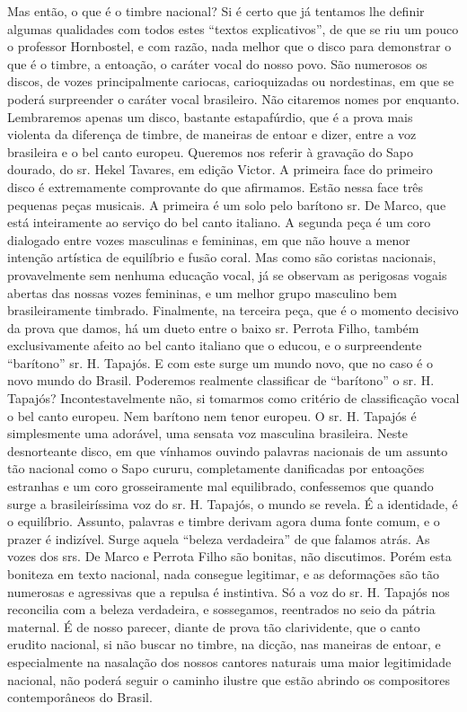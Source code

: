 Mas então, o que é o timbre nacional? Si é certo que já tentamos lhe
definir algumas qualidades com todos estes ``textos explicativos'', de
que se riu um pouco o professor Hornbostel, e com razão, nada melhor que
o disco para demonstrar o que é o timbre, a entoação, o caráter vocal do
nosso povo. São numerosos os discos, de vozes principalmente cariocas,
carioquizadas ou nordestinas, em que se poderá surpreender o caráter
vocal brasileiro. Não citaremos nomes por enquanto. Lembraremos apenas
um disco, bastante estapafúrdio, que é a prova mais violenta da
diferença de timbre, de maneiras de entoar e dizer, entre a voz
brasileira e o bel canto europeu. Queremos nos referir à gravação do
Sapo dourado, do sr. Hekel Tavares, em edição Victor. A primeira face do
primeiro disco é extremamente comprovante do que afirmamos. Estão nessa
face três pequenas peças musicais. A primeira é um solo pelo barítono
sr. De Marco, que está inteiramente ao serviço do bel canto italiano. A
segunda peça é um coro dialogado entre vozes masculinas e femininas, em
que não houve a menor intenção artística de equilíbrio e fusão coral.
Mas como são coristas nacionais, provavelmente sem nenhuma educação
vocal, já se observam as perigosas vogais abertas das nossas vozes
femininas, e um melhor grupo masculino bem brasileiramente timbrado.
Finalmente, na terceira peça, que é o momento decisivo da prova que
damos, há um dueto entre o baixo sr. Perrota Filho, também
exclusivamente afeito ao bel canto italiano que o educou, e o
surpreendente ``barítono'' sr. H. Tapajós. E com este surge um mundo
novo, que no caso é o novo mundo do Brasil. Poderemos realmente
classificar de ``barítono'' o sr. H. Tapajós? Incontestavelmente não, si
tomarmos como critério de classificação vocal o bel canto europeu. Nem
barítono nem tenor europeu. O sr. H. Tapajós é simplesmente uma
adorável, uma sensata voz masculina brasileira. Neste desnorteante
disco, em que vínhamos ouvindo palavras nacionais de um assunto tão
nacional como o Sapo cururu, completamente danificadas por entoações
estranhas e um coro grosseiramente mal equilibrado, confessemos que
quando surge a brasileiríssima voz do sr. H. Tapajós, o mundo se revela.
É a identidade, é o equilíbrio. Assunto, palavras e timbre derivam agora
duma fonte comum, e o prazer é indizível. Surge aquela ``beleza
verdadeira'' de que falamos atrás. As vozes dos srs. De Marco e Perrota
Filho são bonitas, não discutimos. Porém esta boniteza em texto
nacional, nada consegue legitimar, e as deformações são tão numerosas e
agressivas que a repulsa é instintiva. Só a voz do sr. H. Tapajós nos
reconcilia com a beleza verdadeira, e sossegamos, reentrados no seio da
pátria maternal. É de nosso parecer, diante de prova tão clarividente,
que o canto erudito nacional, si não buscar no timbre, na dicção, nas
maneiras de entoar, e especialmente na nasalação dos nossos cantores
naturais uma maior legitimidade nacional, não poderá seguir o caminho
ilustre que estão abrindo os compositores contemporâneos do Brasil.

